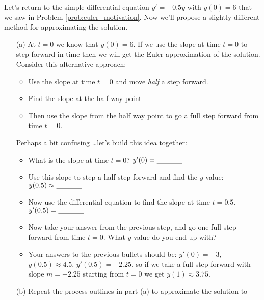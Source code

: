 \begin{problem}
    Let's return to the simple differential equation $y' = -0.5y$ with $y(0) = 6$ that we
    saw in Problem \ref{prob:euler_motivation}.  Now we'll propose a slightly different
    method for approximating the solution.
    \begin{enumerate}
        \item[(a)] At $t=0$ we know that $y(0)=6$.  If we use the slope at time $t=0$ to
            step forward in time then we will get the Euler approximation of the solution.
            Consider this alternative approach: 
            \begin{itemize}
                \item Use the slope at time $t=0$ and move {\it half} a step forward.  
                \item Find the slope at the half-way point
                \item Then use the slope from the half way point to go a full step forward
                    from time $t=0$.  
            \end{itemize} 
            Perhaps a bit confusing \ldots let's build this idea together:
            \begin{itemize}
                \item What is the slope at time $t=0$? $y'(0) =
                    \underline{\hspace{0.5in}}$
                \item Use this slope to step a half step forward and find the $y$ value:
                    $y(0.5) \approx \underline{\hspace{0.5in}}$
                \item Now use the differential equation to find the slope at time $t=0.5$.
                    $y'(0.5) = \underline{\hspace{0.5in}}$
                \item Now take your answer from the previous step, and go one full step
                    forward from time $t=0$.  What $y$ value do you end up with? 
                \item Your answers to the previous bullets should be: $y'(0) = -3$, $y(0.5) \approx
                    4.5$, $y'(0.5) = -2.25$, so if we take a full step forward with slope
                    $m=-2.25$ starting from $t=0$ we get $y(1) \approx 3.75$.
            \end{itemize}
        \item[(b)] Repeat the process outlines in part (a) to approximate the solution to

\end{enumerate}
\end{problem}
